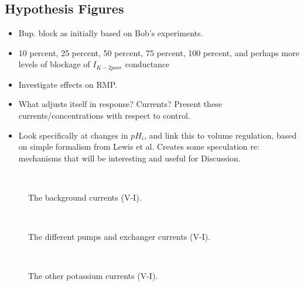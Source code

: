 \subsection{Hypothesis Figures}
\begin{itemize}
\item Bup. block as initially based on Bob's experiments.
\item 10 percent, 25 percent, 50 percent, 75 percent, 100 percent, and
  perhaps more levels of blockage of $I_{K-2pore}$ conductance
\item Investigate effects on RMP.
\item What adjusts itself in response? Currents? Present these
    currents/concentrations with respect to control.
\item Look specifically at changes in $pH_i$, and link this to volume
  regulation, based on simple formalism from Lewis et al. Creates some
  speculation re: mechanisms that will be interesting and useful for
  Discussion.
\end{itemize}

\begin{figure}
  \centering
  \\
  \subfloat{\hspace{0.38\textwidth}}
  \caption{The background currents (V-I).}
  \label{fig:background-currents-vi}
\end{figure}

\begin{figure}
  \centering
  \\
  \subfloat{\hspace{0.38\textwidth}}
  \caption{The different pumps and exchanger currents (V-I).}
  \label{fig:pumps-and-exchangers-vi}
\end{figure}


\begin{figure}
  \centering
  \\
  \caption{The other potassium currents (V-I).}
  \label{fig:potassium-currents-vi}
\end{figure}

